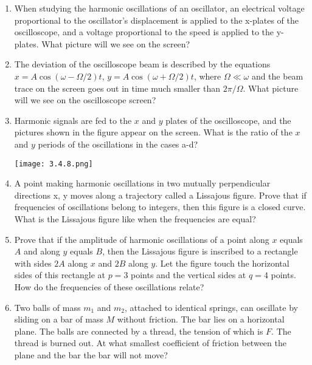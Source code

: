 \documentclass{article}
\begin{document}
\begin{enumerate}[label=3.4.\arabic*]
\item When studying the harmonic oscillations of an oscillator, an electrical voltage proportional to the oscillator's displacement is applied to the x-plates of the oscilloscope, and a voltage proportional to the speed is applied to the y-plates. What picture will we see on the screen?

\item The deviation of the oscilloscope beam is described by the equations $x = A \cos{(\omega - \Omega/2)t}$, \newline $y = A \cos{(\omega + \Omega/2)t}$, where $\Omega \ll \omega$ and the beam trace on the screen goes out in time much smaller than $2\pi / \Omega$. What picture will we see on the oscilloscope screen?

\item Harmonic signals are fed to the $x$ and $y$ plates of the oscilloscope, and the pictures shown in the figure appear on the screen. What is the ratio of the $x$ and $y$ periods of the oscillations in the cases a-d?

\begin{center}
    \texttt{[image: 3.4.8.png]}
\end{center}



\item A point making harmonic oscillations in two mutually perpendicular directions x, y moves along a trajectory called a Lissajous figure. Prove that if frequencies of oscillations belong to integers, then this figure is a closed curve. What is the Lissajous figure like when the frequencies are equal?

\item Prove that if the amplitude of harmonic oscillations of a point along $x$ equals $A$ and along $y$ equals $B$, then the Lissajous figure is inscribed to a rectangle with sides $2A$ along $x$ and $2B$ along $y$. Let the figure touch the horizontal sides of this rectangle at $p = 3$ points and the vertical sides at $q = 4$ points. How do the frequencies of these oscillations relate?

\item Two balls of mass $m_1$ and $m_2$, attached to identical springs, can oscillate by sliding on a bar of mass $M$ without friction. The bar lies on a horizontal plane. The balls are connected by a thread, the tension of which is $F$. The thread is burned out. At what smallest coefficient of friction between the plane and the bar the bar will not move?


\end{enumerate}
\end{document}
